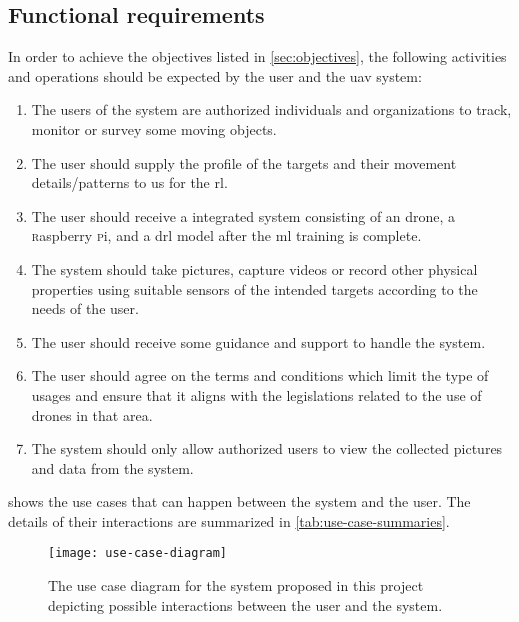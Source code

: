 \documentclass[../main.tex]{subfiles}
\begin{document}
\subsection{Functional requirements}

In order to achieve the objectives listed
in \cref{sec:objectives}, the following activities 
and operations should be expected by the user 
and the \gls{uav} system:

\begin{enumerate}
    \item The users of the system are authorized
        individuals and organizations to track, monitor or survey
        some moving objects.
    \item The user should supply the 
        profile of the targets 
        and their movement details/patterns
        to us for the \gls{rl}.
    \item The user should receive 
        a \uav integrated system consisting of 
        an \anafi drone, a \textsc{r}aspberry \textsc{p}i,
        and a \gls{drl} model after the \gls{ml} training
        is complete.
    \item The system should take pictures, capture videos
        or record other physical properties using
        suitable sensors of the intended
        targets according to the needs
        of the user.
    \item The user should receive some 
        guidance and support 
        to handle the system.
    \item The user should agree on 
        the terms and conditions 
        which limit the type of usages and 
        ensure that it aligns with the legislations
        related to the use of drones in that area.
    \item The system should only allow 
        authorized users 
        to view the collected pictures and 
        data from the \anafi system.
\end{enumerate}

 shows the use cases that can
happen between the system and the user. The details of their
interactions are summarized in \cref{tab:use-case-summaries}.

\begin{figure}[tbp] 
    \centering
    \texttt{[image: use-case-diagram]} 
    \caption{The use case diagram for the system proposed 
            in this project depicting possible interactions 
            between the user and the system.}
    \label{fig:use-case-diagram} 
\end{figure}
\end{document}
